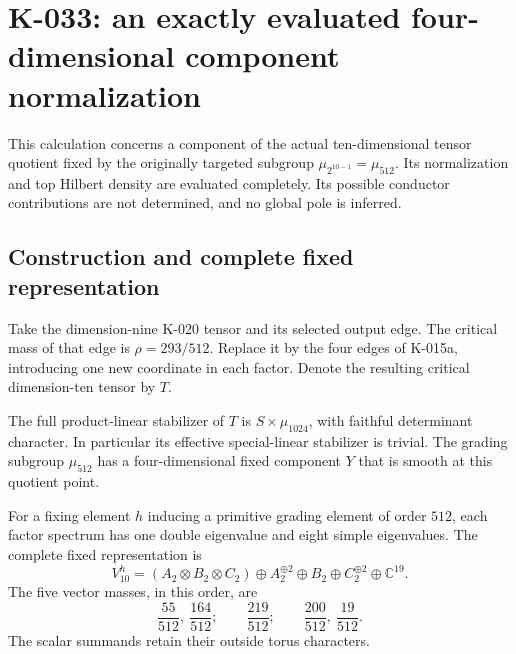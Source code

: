 \section{K-033: an exactly evaluated four-dimensional component normalization}

This calculation concerns a component of the actual ten-dimensional
tensor quotient fixed by the originally targeted subgroup
$\mu_{2^{10-1}}=\mu_{512}$.  Its normalization and top Hilbert density
are evaluated completely.  Its possible conductor contributions are
not determined, and no global pole is inferred.

\subsection*{Construction and complete fixed representation}

Take the dimension-nine K-020 tensor and its selected output edge.
The critical mass of that edge is $\rho=293/512$.  Replace it by
the four edges of K-015a, introducing one new coordinate in each
factor.  Denote the resulting critical dimension-ten tensor by $T$.

\begin{lemma}[K-033a]
The full product-linear stabilizer of $T$ is
$S\times\mu_{1024}$, with faithful determinant character.  In
particular its effective special-linear stabilizer is trivial.
The grading subgroup $\mu_{512}$ has a four-dimensional fixed
component $Y$ that is smooth at this quotient point.

For a fixing element $h$ inducing a primitive grading element of
order $512$, each factor spectrum has one double eigenvalue and
eight simple eigenvalues.  The complete fixed representation is
\[
 V_{10}^h=(A_2\otimes B_2\otimes C_2)\oplus A_2^{\oplus2}
                \oplus B_2\oplus C_2^{\oplus2}\oplus\mathbb C^{19}.
                                                        \tag{K-033a}
\]
The five vector masses, in this order, are
\[
 \frac{55}{512},\ \frac{164}{512};\qquad
 \frac{219}{512};\qquad
 \frac{200}{512},\ \frac{19}{512}.                       \tag{K-033b}
\]
The scalar summands retain their outside torus characters.
\end{lemma}

